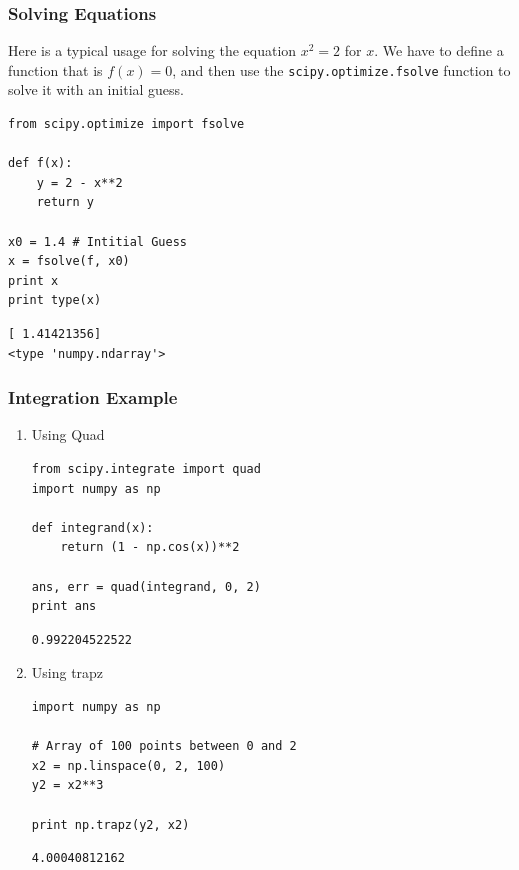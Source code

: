 \documentclass[11pt]{article}
\begin{document}
\subsubsection{Solving Equations}
\label{sec:org709e27b}
Here is a typical usage for solving the equation \(x^2 = 2\) for \(x\). We have to define a function that is \(f(x) = 0\), and then use the \texttt{scipy.optimize.fsolve} function to solve it with an initial guess.

\begin{verbatim}
from scipy.optimize import fsolve

def f(x):
    y = 2 - x**2
    return y

x0 = 1.4 # Intitial Guess
x = fsolve(f, x0)
print x
print type(x)
\end{verbatim}

\begin{verbatim}
[ 1.41421356]
<type 'numpy.ndarray'>
\end{verbatim}



\subsubsection{Integration Example}
\label{sec:orgd3f21c2}

\begin{enumerate}
\item Using Quad
\label{sec:org42be830}
\begin{verbatim}
from scipy.integrate import quad
import numpy as np

def integrand(x):
    return (1 - np.cos(x))**2

ans, err = quad(integrand, 0, 2)
print ans
\end{verbatim}

\begin{verbatim}
0.992204522522
\end{verbatim}


\item Using trapz
\label{sec:org5e5bb2f}

\begin{verbatim}
import numpy as np

# Array of 100 points between 0 and 2
x2 = np.linspace(0, 2, 100)
y2 = x2**3

print np.trapz(y2, x2)
\end{verbatim}

\begin{verbatim}
4.00040812162
\end{verbatim}
\end{enumerate}
\end{document}
